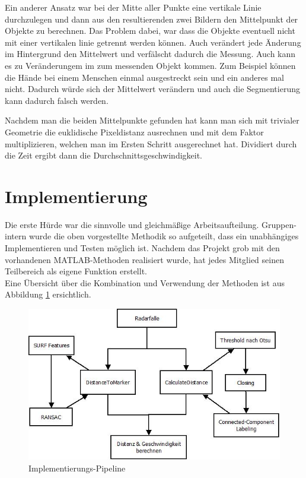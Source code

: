 \documentclass[deutsch]{scrartcl}
\begin{document}
Ein anderer Ansatz war bei der Mitte aller Punkte eine vertikale Linie durchzulegen und dann aus den resultierenden zwei Bildern den Mittelpunkt der Objekte zu berechnen. Das Problem dabei, war dass die Objekte eventuell nicht mit einer vertikalen linie getrennt werden können. Auch verändert jede Änderung im Hintergrund den Mittelwert und verfälscht dadurch die Messung. Auch kann es zu Veränderungem im zum messenden Objekt kommen. Zum Beispiel können die Hände bei einem Menschen einmal ausgestreckt sein und ein anderes mal nicht. Dadurch würde sich der Mittelwert verändern und auch die Segmentierung kann dadurch falsch werden.

Nachdem man die beiden Mittelpunkte gefunden hat kann man sich mit trivialer Geometrie die euklidische Pixeldistanz ausrechnen und mit dem Faktor multiplizieren, welchen man im Ersten Schritt ausgerechnet hat. Dividiert durch die Zeit ergibt dann die Durchschnittsgeschwindigkeit.


\section{Implementierung}

Die erste Hürde war die sinnvolle und gleichmäßige Arbeitsaufteilung. Gruppen-intern wurde die oben vorgestellte Methodik so aufgeteilt, dass ein unabhängiges Implementieren  und Testen möglich ist. Nachdem das Projekt grob mit den vorhandenen MATLAB-Methoden realisiert wurde, hat jedes Mitglied seinen Teilbereich als eigene Funktion erstellt.\\

Eine Übersicht über die Kombination und Verwendung der Methoden ist aus Abbildung \ref{fig:implPipeline} ersichtlich. 

\begin{figure}[h]
\centering
\includegraphics[scale=0.8]{Implementationspipeline}
\caption{Implementierungs-Pipeline}
\label{fig:implPipeline}
\end{figure}
\end{document}
